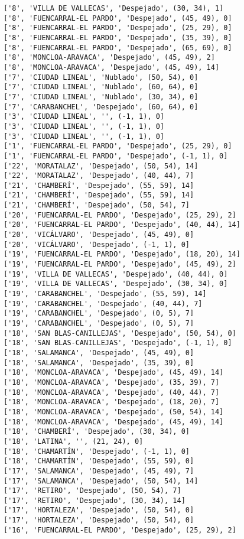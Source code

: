 \documentclass[11pt]{article}
\begin{document}
\begin{Verbatim}[commandchars=\\\{\}]
['8', 'VILLA DE VALLECAS', 'Despejado', (30, 34), 1]
['8', 'FUENCARRAL-EL PARDO', 'Despejado', (45, 49), 0]
['8', 'FUENCARRAL-EL PARDO', 'Despejado', (25, 29), 0]
['8', 'FUENCARRAL-EL PARDO', 'Despejado', (35, 39), 0]
['8', 'FUENCARRAL-EL PARDO', 'Despejado', (65, 69), 0]
['8', 'MONCLOA-ARAVACA', 'Despejado', (45, 49), 2]
['8', 'MONCLOA-ARAVACA', 'Despejado', (45, 49), 14]
['7', 'CIUDAD LINEAL', 'Nublado', (50, 54), 0]
['7', 'CIUDAD LINEAL', 'Nublado', (60, 64), 0]
['7', 'CIUDAD LINEAL', 'Nublado', (30, 34), 0]
['7', 'CARABANCHEL', 'Despejado', (60, 64), 0]
['3', 'CIUDAD LINEAL', '', (-1, 1), 0]
['3', 'CIUDAD LINEAL', '', (-1, 1), 0]
['3', 'CIUDAD LINEAL', '', (-1, 1), 0]
['1', 'FUENCARRAL-EL PARDO', 'Despejado', (25, 29), 0]
['1', 'FUENCARRAL-EL PARDO', 'Despejado', (-1, 1), 0]
['22', 'MORATALAZ', 'Despejado', (50, 54), 14]
['22', 'MORATALAZ', 'Despejado', (40, 44), 7]
['21', 'CHAMBERÍ', 'Despejado', (55, 59), 14]
['21', 'CHAMBERÍ', 'Despejado', (55, 59), 14]
['21', 'CHAMBERÍ', 'Despejado', (50, 54), 7]
['20', 'FUENCARRAL-EL PARDO', 'Despejado', (25, 29), 2]
['20', 'FUENCARRAL-EL PARDO', 'Despejado', (40, 44), 14]
['20', 'VICÁLVARO', 'Despejado', (45, 49), 0]
['20', 'VICÁLVARO', 'Despejado', (-1, 1), 0]
['19', 'FUENCARRAL-EL PARDO', 'Despejado', (18, 20), 14]
['19', 'FUENCARRAL-EL PARDO', 'Despejado', (45, 49), 2]
['19', 'VILLA DE VALLECAS', 'Despejado', (40, 44), 0]
['19', 'VILLA DE VALLECAS', 'Despejado', (30, 34), 0]
['19', 'CARABANCHEL', 'Despejado', (55, 59), 14]
['19', 'CARABANCHEL', 'Despejado', (40, 44), 7]
['19', 'CARABANCHEL', 'Despejado', (0, 5), 7]
['19', 'CARABANCHEL', 'Despejado', (0, 5), 7]
['18', 'SAN BLAS-CANILLEJAS', 'Despejado', (50, 54), 0]
['18', 'SAN BLAS-CANILLEJAS', 'Despejado', (-1, 1), 0]
['18', 'SALAMANCA', 'Despejado', (45, 49), 0]
['18', 'SALAMANCA', 'Despejado', (35, 39), 0]
['18', 'MONCLOA-ARAVACA', 'Despejado', (45, 49), 14]
['18', 'MONCLOA-ARAVACA', 'Despejado', (35, 39), 7]
['18', 'MONCLOA-ARAVACA', 'Despejado', (40, 44), 7]
['18', 'MONCLOA-ARAVACA', 'Despejado', (18, 20), 7]
['18', 'MONCLOA-ARAVACA', 'Despejado', (50, 54), 14]
['18', 'MONCLOA-ARAVACA', 'Despejado', (45, 49), 14]
['18', 'CHAMBERÍ', 'Despejado', (30, 34), 0]
['18', 'LATINA', '', (21, 24), 0]
['18', 'CHAMARTÍN', 'Despejado', (-1, 1), 0]
['18', 'CHAMARTÍN', 'Despejado', (55, 59), 0]
['17', 'SALAMANCA', 'Despejado', (45, 49), 7]
['17', 'SALAMANCA', 'Despejado', (50, 54), 14]
['17', 'RETIRO', 'Despejado', (50, 54), 7]
['17', 'RETIRO', 'Despejado', (30, 34), 14]
['17', 'HORTALEZA', 'Despejado', (50, 54), 0]
['17', 'HORTALEZA', 'Despejado', (50, 54), 0]
['16', 'FUENCARRAL-EL PARDO', 'Despejado', (25, 29), 2]

\end{Verbatim}
\end{document}
